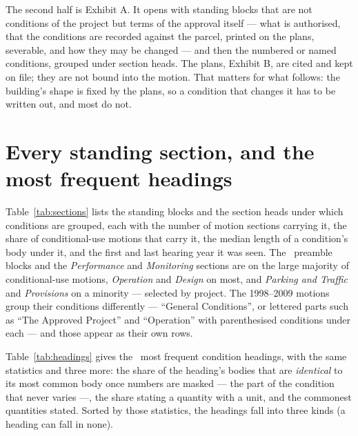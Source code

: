 \documentclass[11pt]{article}
\newcommand{\cctable}[1]{\FloatBarrier\def\cctab{#1}}
\begin{document}
The second half is Exhibit A. It opens with standing blocks that are not conditions of the
project but terms of the approval itself --- what is authorised, that the conditions are
recorded against the parcel, printed on the plans, severable, and how they may be changed ---
and then the numbered or named conditions, grouped under section heads. The plans, Exhibit B,
are cited and kept on file; they are not bound into the motion. That matters for what
follows: the building's shape is fixed by the plans, so a condition that changes it has to be
written out, and most do not.

\cctable{anatomy}

\section{Every standing section, and the most frequent headings}
\label{sec:template}

Table~\ref{tab:sections} lists the standing blocks and the section heads under which conditions
are grouped, each with the number of motion sections carrying it, the share of conditional-use
motions that carry it, the median length of a condition's body under it, and the first and
last hearing year it was seen. The \ccPreambleBlocks\ preamble blocks and the \emph{Performance} and
\emph{Monitoring} sections are on the large majority of conditional-use motions,
\emph{Operation} and \emph{Design} on most, and \emph{Parking and Traffic} and
\emph{Provisions} on a minority --- selected by project.
The 1998--2009 motions group their conditions differently --- ``General Conditions'', or
lettered parts such as ``The Approved Project'' and ``Operation'' with parenthesised
conditions under each --- and those appear as their own rows.

\cctable{sections}

Table~\ref{tab:headings} gives the \ccTopHeadings\ most frequent condition headings, with the
same statistics and three more: the share of the heading's bodies that are \emph{identical} to
its most common body once numbers are masked --- the part of the condition that never varies
---, the share stating a quantity with a unit, and the commonest quantities stated. Sorted by those
statistics, the headings fall into three kinds (a heading can fall in none).
\end{document}
